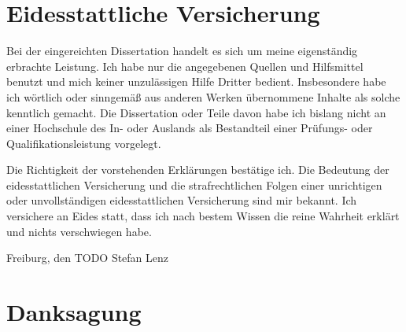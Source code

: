 \documentclass[12pt]{article}
\begin{document}
\begin{appendices}
\clearpage
\section{Eidesstattliche Versicherung}
Bei der eingereichten Dissertation handelt es sich um meine eigenständig erbrachte Leistung.
Ich habe nur die angegebenen Quellen und Hilfsmittel benutzt und mich keiner unzulässigen Hilfe Dritter bedient. Insbesondere habe ich wörtlich oder sinngemäß aus anderen Werken übernommene Inhalte als solche kenntlich gemacht. 
Die Dissertation oder Teile davon habe ich bislang nicht an einer Hochschule des In- oder Auslands als Bestandteil einer Prüfungs- oder Qualifikationsleistung vorgelegt.

Die Richtigkeit der vorstehenden Erklärungen bestätige ich. Die Bedeutung der eidesstattlichen Versicherung und die strafrechtlichen Folgen einer unrichtigen oder unvollständigen eidesstattlichen Versicherung sind mir bekannt.
Ich versichere an Eides statt, dass ich nach bestem Wissen die reine Wahrheit erklärt und nichts verschwiegen habe.
\vspace{2cm}

Freiburg, den TODO \hspace{3cm} Stefan Lenz

\clearpage
\section{Danksagung}



\end{appendices}
\end{document}
